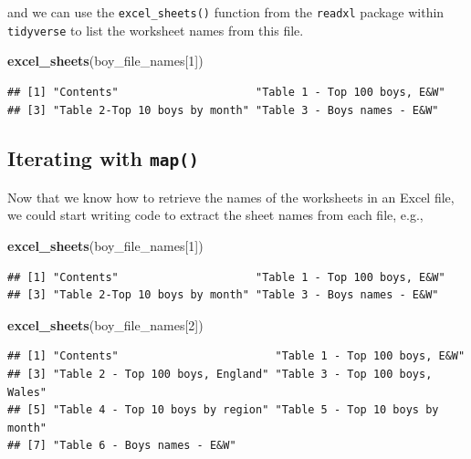 \documentclass[
]{book}
\newenvironment{Shaded}{\begin{snugshade}}{\end{snugshade}}
\newcommand{\DecValTok}[1]{\textcolor[rgb]{0.00,0.00,0.81}{#1}}
\newcommand{\KeywordTok}[1]{\textcolor[rgb]{0.13,0.29,0.53}{\textbf{#1}}}
\newcommand{\NormalTok}[1]{#1}
\begin{document}
and we can use the \texttt{excel\_sheets()} function from the \texttt{readxl} package
within \texttt{tidyverse} to list the worksheet names from this file.

\begin{Shaded}
\begin{Highlighting}[]
\KeywordTok{excel\_sheets}\NormalTok{(boy\_file\_names[}\DecValTok{1}\NormalTok{])}
\end{Highlighting}
\end{Shaded}

\begin{verbatim}
## [1] "Contents"                     "Table 1 - Top 100 boys, E&W" 
## [3] "Table 2-Top 10 boys by month" "Table 3 - Boys names - E&W"
\end{verbatim}

\hypertarget{iterating-with-map}{%
\subsection{\texorpdfstring{Iterating with \texttt{map()}}{Iterating with map()}}\label{iterating-with-map}}

Now that we know how to retrieve the names of the worksheets in an
Excel file, we could start writing code to extract the sheet names from
each file, e.g.,

\begin{Shaded}
\begin{Highlighting}[]
\KeywordTok{excel\_sheets}\NormalTok{(boy\_file\_names[}\DecValTok{1}\NormalTok{])}
\end{Highlighting}
\end{Shaded}

\begin{verbatim}
## [1] "Contents"                     "Table 1 - Top 100 boys, E&W" 
## [3] "Table 2-Top 10 boys by month" "Table 3 - Boys names - E&W"
\end{verbatim}

\begin{Shaded}
\begin{Highlighting}[]
\KeywordTok{excel\_sheets}\NormalTok{(boy\_file\_names[}\DecValTok{2}\NormalTok{])}
\end{Highlighting}
\end{Shaded}

\begin{verbatim}
## [1] "Contents"                        "Table 1 - Top 100 boys, E&W"    
## [3] "Table 2 - Top 100 boys, England" "Table 3 - Top 100 boys, Wales"  
## [5] "Table 4 - Top 10 boys by region" "Table 5 - Top 10 boys by month" 
## [7] "Table 6 - Boys names - E&W"
\end{verbatim}
\end{document}
